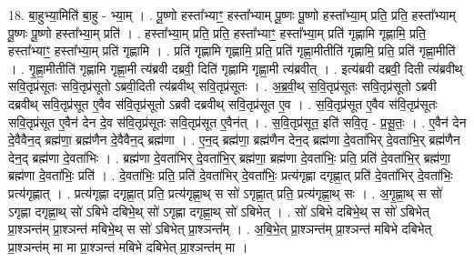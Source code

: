 \documentclass[17pt]{extarticle}
\begin{document}
18. बा॒हुभ्या॒मिति॑ बा॒हु - भ्या॒म् । . पू॒ष्णो हस्ता᳚भ्याꣳ॒॒ हस्ता᳚भ्याम् पू॒ष्णः पू॒ष्णो हस्ता᳚भ्या॒म् प्रति॒ प्रति॒ हस्ता᳚भ्याम् पू॒ष्णः पू॒ष्णो हस्ता᳚भ्या॒म् प्रति॑ । . हस्ता᳚भ्या॒म् प्रति॒ प्रति॒ हस्ता᳚भ्याꣳ॒॒ हस्ता᳚भ्या॒म् प्रति॑ गृह्णामि गृह्णामि॒ प्रति॒ हस्ता᳚भ्याꣳ॒॒ हस्ता᳚भ्या॒म् प्रति॑ गृह्णामि । . प्रति॑ गृह्णामि गृह्णामि॒ प्रति॒ प्रति॑ गृह्णा॒मीतीति॑ गृह्णामि॒ प्रति॒ प्रति॑ गृह्णा॒मीति॑ । . गृ॒ह्णा॒मीतीति॑ गृह्णामि गृह्णा॒मी त्य॑ब्रवी दब्रवी॒ दिति॑ गृह्णामि गृह्णा॒मी त्य॑ब्रवीत् । . इत्य॑ब्रवी दब्रवी॒ दिती त्य॑ब्रवीथ् सवि॒तृप्र॑सूतः सवि॒तृप्र॑सूतो ऽब्रवी॒दिती त्य॑ब्रवीथ् सवि॒तृप्र॑सूतः । . अ॒ब्र॒वी॒थ् स॒वि॒तृप्र॑सूतः सवि॒तृप्र॑सूतो ऽब्रवी दब्रवीथ् सवि॒तृप्र॑सूत ए॒वैव स॑वि॒तृप्र॑सूतो ऽब्रवी दब्रवीथ् सवि॒तृप्र॑सूत ए॒व । . स॒वि॒तृप्र॑सूत ए॒वैव स॑वि॒तृप्र॑सूतः सवि॒तृप्र॑सूत ए॒वैन॑ देन दे॒व स॑वि॒तृप्र॑सूतः सवि॒तृप्र॑सूत ए॒वैन॑त् । . स॒वि॒तृप्र॑सूत॒ इति॑ सवि॒तृ - प्र॒सू॒तः॒ । . ए॒वैन॑ देन दे॒वैवैन॒द् ब्रह्म॑णा॒ ब्रह्म॑णैन दे॒वैवैन॒द् ब्रह्म॑णा । . ए॒न॒द् ब्रह्म॑णा॒ ब्रह्म॑णैन देन॒द् ब्रह्म॑णा दे॒वता॑भिर् दे॒वता॑भि॒र् ब्रह्म॑णैन देन॒द् ब्रह्म॑णा दे॒वता॑भिः । . ब्रह्म॑णा दे॒वता॑भिर् दे॒वता॑भि॒र् ब्रह्म॑णा॒ ब्रह्म॑णा दे॒वता॑भिः॒ प्रति॒ प्रति॑ दे॒वता॑भि॒र् ब्रह्म॑णा॒ ब्रह्म॑णा दे॒वता॑भिः॒ प्रति॑ । . दे॒वता॑भिः॒ प्रति॒ प्रति॑ दे॒वता॑भिर् दे॒वता॑भिः॒ प्रत्य॑गृह्णा दगृह्णा॒त् प्रति॑ दे॒वता॑भिर् दे॒वता॑भिः॒ प्रत्य॑गृह्णात् । . प्रत्य॑गृह्णा दगृह्णा॒त् प्रति॒ प्रत्य॑गृह्णा॒थ् स सो॑ ऽगृह्णा॒त् प्रति॒ प्रत्य॑गृह्णा॒थ् सः । . अ॒गृ॒ह्णा॒थ् स सो॑ ऽगृह्णा दगृह्णा॒थ् सो॑ ऽबिभे दबिभे॒थ् सो॑ ऽगृह्णा दगृह्णा॒थ् सो॑ ऽबिभेत् । . सो॑ ऽबिभे दबिभे॒थ् स सो॑ ऽबिभेत् प्रा॒श्ञन्त॑म् प्रा॒श्ञन्त॑ मबिभे॒थ् स सो॑ ऽबिभेत् प्रा॒श्ञन्त᳚म् । . अ॒बि॒भे॒त् प्रा॒श्ञन्त॑म् प्रा॒श्ञन्त॑ मबिभे दबिभेत् प्रा॒श्ञन्त॑म् मा मा प्रा॒श्ञन्त॑ मबिभे दबिभेत् प्रा॒श्ञन्त॑म् मा । \newline
\end{document}
